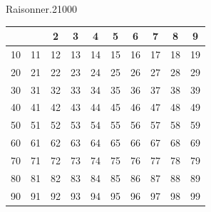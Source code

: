 \begin{pageParcourst}
\begin{ExoCtN}{Raisonner.}{2}{1}{0}{0}{0}
\begin{minipage}{0.5\linewidth}
\begin{tabular}{|c|c|c|c|c|c|c|c|c|c|}
 \hline 
 &  & 2 & 3 & 4 & 5 & 6 & 7 & 8 & 9 \\ 
 \hline 
 10&11 & 12 & 13 & 14 & 15 & 16 & 17 & 18 & 19 \\
 \hline 
 20&21 & 22 & 23 & 24 & 25 & 26 & 27 & 28 & 29 \\
 \hline 
 30&31 & 32 & 33 & 34 & 35 & 36 & 37 & 38 & 39 \\
 \hline 
 40&41 & 42 & 43 & 44 & 45 & 46 & 47 & 48 & 49 \\
 \hline 
 50&51 & 52 & 53 & 54 & 55 & 56 & 57 & 58 & 59 \\
 \hline 
 60&61 & 62 & 63 & 64 & 65 & 66 & 67 & 68 & 69 \\
 \hline 
 70&71 & 72 & 73 & 74 & 75 & 76 & 77 & 78 & 79 \\
 \hline 
 80&81 & 82 & 83 & 84 & 85 & 86 & 87 & 88 & 89 \\
 \hline 
 90&91 & 92 & 93 & 94 & 95 & 96 & 97 & 98 & 99 \\
 \hline 
 \end{tabular}  
 
 \end{minipage}


 
\end{ExoCtN}
 
\end{pageParcourst}
%




